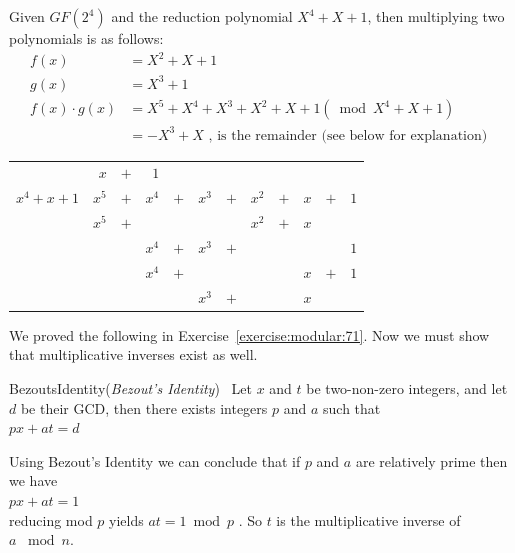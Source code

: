 \begin{eg} Given $GF(2^4)$ and the reduction polynomial $X^4 + X + 1$, then multiplying two polynomials is as follows:
\begin{align*}	
	f(x) &=  X^2 + X + 1\\
	g(x) &= X^3 + 1\\
 f(x) \cdot g(x) &= X^5 + X^4 + X^3 + X^2 + X + 1 (\bmod X^4 + X + 1)\\ 
	       &= - X^3 + X \text{ , is the remainder (see below for explanation) }
\end{align*}
\begin{center}
\begin{tabular}{rrcrcrcrcrcr}
        &  $x$  &  $+$  &      $1$         \\ \cline{2-12}
 \multicolumn{1}{r|}{$x^4 + x + 1$}
        &  $x^5$  &  $+$  &  $x^4$  &  $+$  & $ x^3$  &  $+$  &  $x^2$  &  $+$  & $ x$  &  $+$  &  $1$  \\
        & $x^5$   &  $+$  &       	&          &      	  &          &  $x^2$   & $+$  &  $x$     \\ \cline{2-12}
        &         &       &         $x^4$  & $+$   &  $ x^3$  &   $+$  &             &         &         &          &  $1$  \\
        &         &       &         $x^4$  &  $+$  &             &           &              &         &  $x$   & $+$  &  $1$   \\ \cline{4-12}
        &         &       &                    &          &   $x^3$ &    $+$  &              &         &  $x$    
\end{tabular}
\end{center}
\end{eg}
We proved the following in Exercise~\ref{exercise:modular:71}.
\newline \newline
Now we must show that multiplicative inverses exist as well.

\begin{prop}{BezoutsIdentity}(\emph{Bezout's Identity})~ Let $x$ and $t$ be two-non-zero integers, and let $d$ be their GCD, then there exists integers $p$ and $a$ such that\\
 \hspace*{\parindent} $px + at = d$
\end{prop}

\begin{corollary}
Using Bezout's Identity we can conclude that if $p$ and $a$ are relatively prime then we have\\
\hspace*{\parindent} $px + at = 1$ \\
reducing mod $p$ yields $at = 1 \bmod p$ .  So $t$ is the multiplicative inverse of\\
 $a$ $\bmod n$.
\end{corollary}

